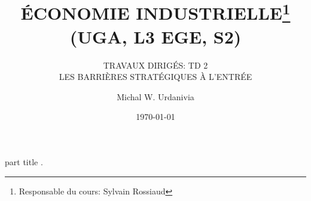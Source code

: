 
\usepackage[svgnames]{xcolor}
\usepackage{tikz}
\usetikzlibrary{shapes.geometric, arrows}
\usepackage{enumerate}   
\usepackage{multirow}
\usepackage{txfonts}
\usepackage{mathrsfs}
\usepackage{pgfplots}
\pgfplotsset{compat = newest}
\usetikzlibrary{positioning, arrows.meta}
\newcommand{\A}{(0,0) ++(135:2) circle (2)}
\newcommand{\B}{(0,0) ++(45:2) circle (2)}
\DeclareMathOperator{\C}{C}
\DeclareMathOperator{\util}{u}
%
  \usepackage{eso-pic}

{
    \begin{centering}
    \begin{beamercolorbox}[sep=11pt,center]{part title}
    \thesection.~\insertsection\par
    \end{beamercolorbox}
    \end{centering}
}
\title[]{ \textbf{ÉCONOMIE INDUSTRIELLE}\footnote{Responsable du cours: Sylvain Rossiaud}\\(\textbf{UGA, L3 EGE, S2})}
\subtitle{TRAVAUX DIRIGÉS: TD 2\\ LES BARRIÈRES STRATÉGIQUES À L'ENTRÉE }
\date{\today}
\author{Michal W. Urdanivia\inst{*}}

